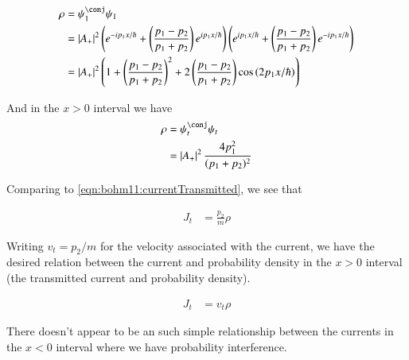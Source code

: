 \begin{align*}
\rho
&= \psi_1^\conj \psi_1 \\
&=
\Abs{ A_{+} }^2
\left(
e^{ -i p_1 x/\hbar }
+\left( \frac{ p_1 - p_2 }{p_1 + p_2} \right) e^{ i p_1 x/\hbar }
\right)
\left(
e^{ i p_1 x/\hbar }
+\left( \frac{ p_1 - p_2 }{p_1 + p_2} \right) e^{ -i p_1 x/\hbar }
\right)
\\
&=
\Abs{ A_{+} }^2
\left(
1
+
\left( \frac{ p_1 - p_2 }{p_1 + p_2} \right)^2
+
2 \left( \frac{ p_1 - p_2 }{p_1 + p_2} \right) \cos\left( 2 p_1 x/\hbar \right)
\right) \\
\end{align*}

And in the $x>0$ interval we have
\begin{align*}
\rho
&= \psi_t^\conj \psi_t \\
&=
\Abs{A_{+}}^2 \frac{4 p_1^2 }{(p_1 + p_2)^2}
\end{align*}

Comparing to \ref{eqn:bohm11:currentTransmitted}, we see that

\begin{align*}
J_t &= \frac{ p_2 }{ m } \rho
\end{align*}

Writing $v_t = p_2/m$ for the velocity associated with the current, we have
the desired relation between the current and probability density in the $x>0$ interval (the transmitted current and probability density).

\begin{align*}
J_t &= v_t \rho
\end{align*}

There doesn't appear to be an such simple relationship between the currents
in the $x<0$ interval where we have probability interference.

